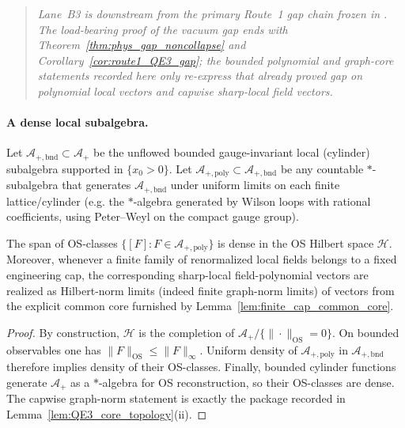 \begin{quote}
\emph{Lane~B3 is downstream from the primary Route~1 gap chain frozen in . The load-bearing proof of the vacuum gap ends with Theorem~\ref{thm:phys_gap_noncollapse} and Corollary~\ref{cor:route1_QE3_gap}; the bounded polynomial and graph-core statements recorded here only re-express that already proved gap on polynomial local vectors and capwise sharp-local field vectors.}
\end{quote}

\paragraph{A dense local subalgebra.}
Let $\mathcal A_{+,\mathrm{bnd}}\subset\mathcal A_+$ be the unflowed bounded gauge-invariant local (cylinder) subalgebra supported in $\{x_0>0\}$.
Let $\mathcal A_{+,\mathrm{poly}}\subset\mathcal A_{+,\mathrm{bnd}}$ be any countable $\ast$-subalgebra that generates
$\mathcal A_{+,\mathrm{bnd}}$ under uniform limits on each finite lattice/cylinder (e.g. the $\ast$-algebra generated by Wilson loops
with rational coefficients, using Peter--Weyl on the compact gauge group).

\begin{lemma}\label{lem:density_poly}
The span of OS-classes $\{[F]:F\in\mathcal A_{+,\mathrm{poly}}\}$ is dense in the OS Hilbert space $\mathcal H$.
Moreover, whenever a finite family of renormalized local fields belongs to a fixed engineering cap, the corresponding sharp-local field-polynomial vectors are realized as Hilbert-norm limits (indeed finite graph-norm limits) of vectors from the explicit common core furnished by Lemma~\ref{lem:finite_cap_common_core}.
\end{lemma}

\begin{proof}
By construction, $\mathcal H$ is the completion of $\mathcal A_+ / \{\|\cdot\|_{\mathrm{OS}}=0\}$.
On bounded observables one has $\|F\|_{\mathrm{OS}}\le \|F\|_{\infty}$.
Uniform density of $\mathcal A_{+,\mathrm{poly}}$ in $\mathcal A_{+,\mathrm{bnd}}$ therefore implies density of their OS-classes.
Finally, bounded cylinder functions generate $\mathcal A_+$ as a $\ast$-algebra for OS reconstruction, so their OS-classes are dense.
The capwise graph-norm statement is exactly the package recorded in Lemma~\ref{lem:QE3_core_topology}(ii).
\end{proof}

